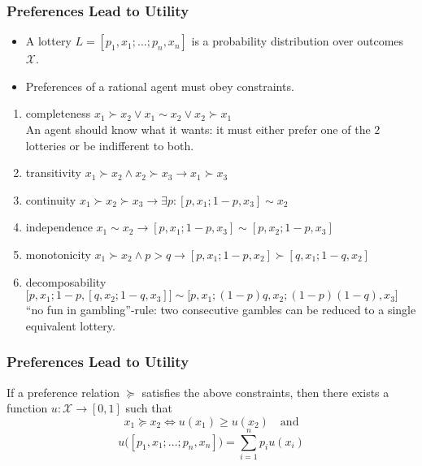 \documentclass[UTF8,11pt,colorlinks,compress,openany]{beamer}%
\begin{document}
\begin{frame}\frametitle{Preferences Lead to Utility}
\begin{itemize}
	\item A lottery $L=[p_1,x_1;\dots;p_n,x_n]$ is a probability distribution over outcomes $\mathcal{X}$.
	\item Preferences of a rational agent must obey constraints.
\end{itemize}
\begin{enumerate}
	\item completeness $x_1\succ x_2\vee x_1\sim x_2\vee x_2\succ x_1$\\
	An agent should know what it wants: it must either prefer one of the $2$ lotteries or be indifferent to both.
	\item transitivity $x_1\succ x_2\wedge x_2\succ x_3\to x_1\succ x_3$
	\item continuity $x_1\succ x_2\succ x_3\to\exists p: [p,x_1;1-p,x_3]\sim x_2$
	\item independence $x_1\sim x_2\to[p,x_1;1-p,x_3]\sim[p,x_2;1-p,x_3]$
	\item monotonicity $x_1\succ x_2\wedge p>q\to[p,x_1;1-p,x_2]\succ[q,x_1;1-q,x_2]$
	\item decomposability $\big[p,x_1;1-p,[q,x_2;1-q,x_3]\big]\sim\big[p,x_1;(1-p)q,x_2;(1-p)(1-q),x_3\big]$\\
	``no fun in gambling''-rule: two consecutive gambles can be reduced to a single equivalent lottery.
\end{enumerate}
\end{frame}

\begin{frame}\frametitle{Preferences Lead to Utility}
\begin{theorem}
If a preference relation $\succeq$ satisfies the above constraints, then there exists a function $u:\mathcal{X}\to[0,1]$ such that
\[x_1\succeq x_2\iff u(x_1)\geq u(x_2)\quad\mbox{and}\]
\[u\big([p_1,x_1;\dots;p_n,x_n]\big)=\sum\limits_{i=1}^n p_i u(x_i)\]
\end{theorem}
\end{frame}
\end{document}
